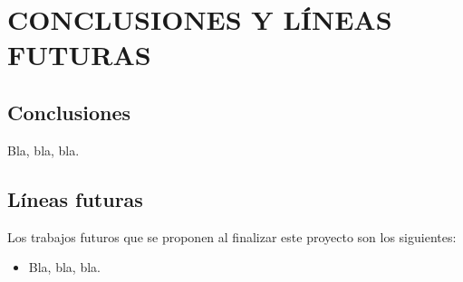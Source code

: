 \newpage
\section{CONCLUSIONES Y LÍNEAS FUTURAS} \label{conclusiones}

\subsection{Conclusiones}

Bla, bla, bla.


\newpage
\subsection{Líneas futuras}

Los trabajos futuros que se proponen al finalizar este proyecto son los siguientes:

\begin{itemize}
    \item Bla, bla, bla.
\end{itemize}